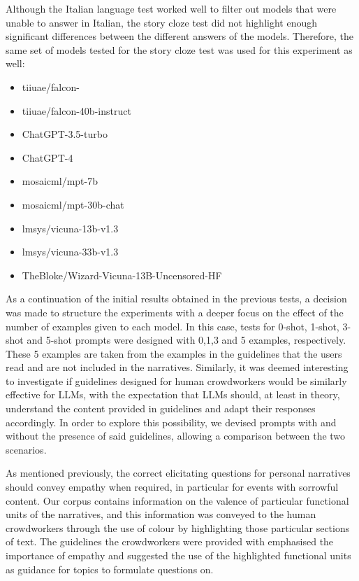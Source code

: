 Although the Italian language test worked well to filter out models that were unable to answer in Italian, the story cloze test did not highlight enough significant differences between the different answers of the models.
Therefore, the same set of models tested for the story cloze test was used for this experiment as well:
\begin{itemize}
    \item   tiiuae/falcon- \cite{falcon40b}
    \item   tiiuae/falcon-40b-instruct \cite{falcon40b}
    \item   ChatGPT-3.5-turbo \cite{chatgpt}
    \item   ChatGPT-4 \cite{openai2023gpt4}
    \item   mosaicml/mpt-7b \cite{mpt7b}
    \item   mosaicml/mpt-30b-chat \cite{mpt30b}
    \item   lmsys/vicuna-13b-v1.3 \cite{touvronllama}
    \item   lmsys/vicuna-33b-v1.3 \cite{touvronllama}
    \item   TheBloke/Wizard-Vicuna-13B-Uncensored-HF \cite{wizard-vicuna}
\end{itemize}
As a continuation of the initial results obtained in the previous tests, a decision was made to structure the experiments with a deeper focus on the effect of the number of examples given to each model. In this case, tests for 0-shot, 1-shot, 3-shot and 5-shot prompts were designed with 0,1,3 and 5 examples, respectively. These 5 examples are taken from the examples in the guidelines that the users read and are not included in the narratives. Similarly, it was deemed interesting to investigate if guidelines designed for human crowdworkers would be similarly effective for LLMs, with the expectation that LLMs should, at least in theory, understand the content provided in guidelines and adapt their responses accordingly. In order to explore this possibility, we devised prompts with and without the presence of said guidelines, allowing a comparison between the two scenarios.

As mentioned previously, the correct elicitating questions for personal narratives should convey empathy when required, in particular for events with sorrowful content. Our corpus contains information on the valence of particular functional units of the narratives, and this information was conveyed to the human crowdworkers through the use of colour by highlighting those particular sections of text. The guidelines the crowdworkers were provided with emphasised the importance of empathy and suggested the use of the highlighted functional units as guidance for topics to formulate questions on. 


